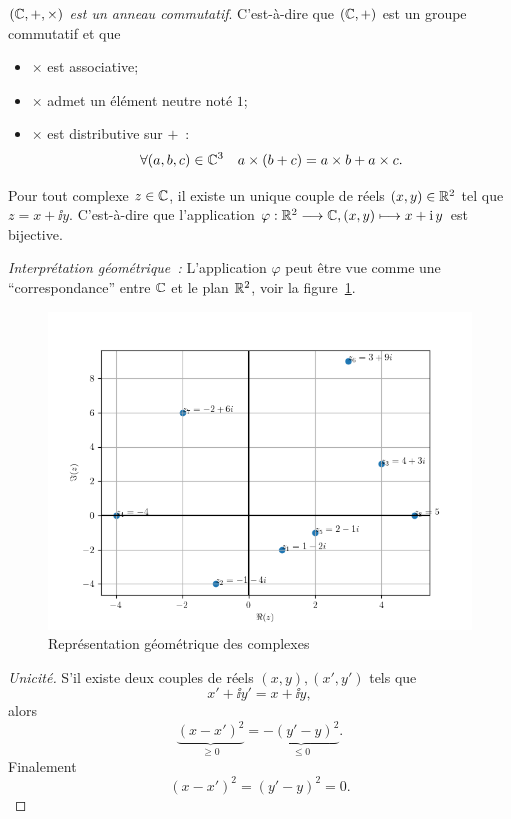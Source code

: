 %
\begin{prop}
    \emph{\((\mathbb{C},+,\times)\) est un anneau commutatif}. C'est-à-dire que \((\mathbb{C},+)\) est un groupe commutatif et que
  \begin{itemize}
  \item \(\times\) est associative;
  \item \(\times\) admet un élément neutre noté \(1\);
  \item \(\times\) est distributive sur \(+\)~:
    \begin{equation}
      \forall (a,b,c) \in \mathbb{C}^3 \quad a \times (b+c)=a \times b+ a \times c.
    \end{equation}
\end{itemize}
\end{prop}
%
\begin{prop}
  Pour tout complexe \(z \in \mathbb{C}\), il existe un unique couple de réels \((x,y) \in \mathbb{R}^2\) tel que \(z=x+\ii y\). C'est-à-dire que l'application \(\varphi:\mathbb{R}^2 \longrightarrow \mathbb{C}, (x,y) \longmapsto x+\operatorname{i} y\) est bijective.
\end{prop}
\emph{Interprétation géométrique~:} L'application $\varphi$ peut être vue comme une ``correspondance'' entre $\mathbb{C}$ et le plan $\mathbb{R}^2$, voir la figure~\ref{fig:complexe}.
\begin{figure}
    \centering
    \includegraphics[scale=0.7]{./Complexes.png}
    \caption{Représentation géométrique des complexes}
    \label{fig:complexe}
\end{figure}
\begin{proof}[Unicité]
  S'il existe deux couples de réels \((x,y),(x',y')\) tels que
  \begin{equation}
    x'+\ii y'=x +\ii y,
  \end{equation}
  alors
  \begin{equation}
    \underbrace{(x-x')^2}_{\geqslant 0}=\underbrace{-(y'-y)^2}_{\leqslant 0}.
  \end{equation}
  Finalement
  \begin{equation}
    (x-x')^2=(y'-y)^2=0.
  \end{equation}
\end{proof}
